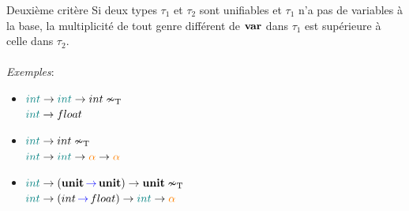 \documentclass[serif]{beamer}
\newcommand{\exemples}{\textit{Exemples}\xspace}
\newcommand{\unit}{\bold{unit}}
\newcommand{\T}{\mathrm{T}}
\begin{document}
\begin{frame}{Deuxième critère}
Si deux types $\tau_1$ et $\tau_2$ sont unifiables et $\tau_1$ n'a pas de variables à la base, la multiplicité de tout genre différent de $\bold{var}$ dans $\tau_1$ est supérieure à celle dans $\tau_2$.
\\~\\
\exemples :
\begin{itemize}
	\item
		$\textcolor{teal}{int} \rightarrow \textcolor{teal}{int} \rightarrow int \nsim_\T$ \\
		$\textcolor{teal}{int} \rightarrow float$
	\item
		$\textcolor{teal}{int} \rightarrow int \nsim_\T$ \\
		$\textcolor{teal}{int} \rightarrow \textcolor{teal}{int} \rightarrow \textcolor{orange}{\alpha} \rightarrow \textcolor{orange}{\alpha}$
	\item
		$\textcolor{teal}{int} \rightarrow (\unit \,\textcolor{blue}{\rightarrow}\, \unit) \rightarrow \unit \nsim_\T$ \\
		$\textcolor{teal}{int} \rightarrow (int \,\textcolor{blue}{\rightarrow}\, float) \rightarrow \textcolor{teal}{int} \rightarrow \textcolor{orange}{\alpha}$
\end{itemize}
\end{frame}

\end{document}
